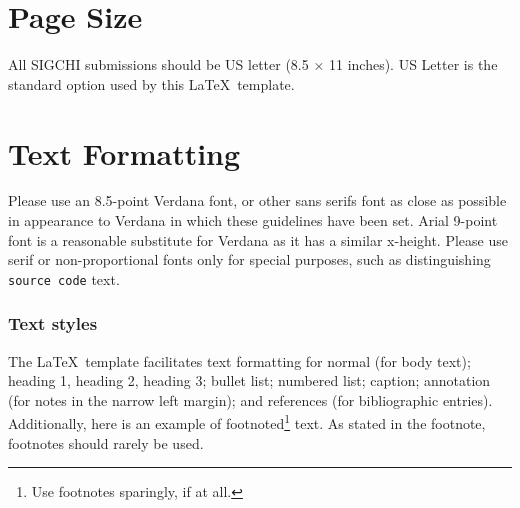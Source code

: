 
\section{Page Size}
All SIGCHI submissions should be US letter (8.5 $\times$ 11
inches). US Letter is the standard option used by this \LaTeX\
template.

\section{Text Formatting}
Please use an 8.5-point Verdana font, or other sans serifs font as
close as possible in appearance to Verdana in which these guidelines
have been set. Arial 9-point font is a reasonable substitute for
Verdana as it has a similar x-height. Please use serif or
non-proportional fonts only for special purposes, such as
distinguishing \texttt{source code} text.

\subsubsection{Text styles}
The \LaTeX\ template facilitates text formatting for normal (for body
text); heading 1, heading 2, heading 3; bullet list; numbered list;
caption; annotation (for notes in the narrow left margin); and
references (for bibliographic entries). Additionally, here is an
example of footnoted\footnote{Use footnotes sparingly, if at all.}
text. As stated in the footnote, footnotes should rarely be used.

